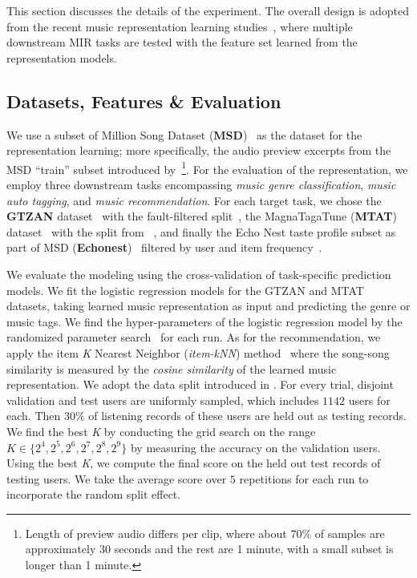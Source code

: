\documentclass{article}
\begin{document}
This section discusses the details of the experiment. The overall design is adopted from the recent music representation learning studies~\cite{DBLP:conf/ismir/ChoiFSC17,DBLP:journals/nca/KimULH20,DBLP:conf/ismir/SpijkervetB21}, where multiple downstream MIR tasks are tested with the feature set learned from the representation models.

\subsection{Datasets, Features \& Evaluation}\label{sec:experimental_setup:datasets_evaluation}

We use a subset of Million Song Dataset (\textbf{MSD})~\cite{Bertin-Mahieux2011} as the dataset for the representation learning; more specifically, the audio preview excerpts from the MSD ``train'' subset introduced by~\cite{DBLP:conf/ismir/PonsNPSES18,app8010150}\footnote{Length of preview audio differs per clip, where about 70\% of samples are approximately 30 seconds and the rest are 1 minute, with a small subset is longer than 1 minute.}.
For the evaluation of the representation, we employ three downstream tasks encompassing \emph{music genre classification}, \emph{music auto tagging}, and  \emph{music recommendation}. For each target task, we chose the \textbf{GTZAN} dataset~\cite{DBLP:journals/taslp/TzanetakisC02} with the fault-filtered split~\cite{DBLP:journals/tmm/KereliukSL15}, the MagnaTagaTune (\textbf{MTAT}) dataset~\cite{DBLP:conf/ismir/LawWMBD09} with the split from ~\cite{lee_multi-level_2017}, and finally the Echo Nest taste profile subset as part of MSD (\textbf{Echonest})~\cite{Bertin-Mahieux2011} filtered by user and item frequency~\cite{DBLP:conf/www/LiangKHJ18}.

We evaluate the modeling using the cross-validation of task-specific prediction models. We fit the logistic regression models for the GTZAN and MTAT datasets, taking learned music representation as input and predicting the genre or music tags. We find the hyper-parameters of the logistic regression model by the randomized parameter search~\cite{DBLP:journals/jmlr/BergstraB12} for each run. As for the recommendation, we apply the item \emph{K} Nearest Neighbor (\emph{item-kNN}) method~\cite{DBLP:journals/tois/DeshpandeK04} where the song-song similarity is measured by the \emph{cosine similarity} of the learned music representation. We adopt the data split introduced in \cite{DBLP:conf/www/LiangKHJ18}. For every trial, disjoint validation and test users are uniformly sampled, which includes $1142$ users for each. Then $30\%$ of listening records of these users are held out as testing records. We find the best \emph{K} by conducting the grid search on the range $\textit{K}\in\{2^{4}, 2^{5}, 2^{6}, 2^{7}, 2^{8}, 2^{9}\}$ by measuring the accuracy on the validation users. Using the best \emph{K}, we compute the final score on the held out test records of testing users. We take the average score over $5$ repetitions for each run to incorporate the random split effect.
\end{document}
